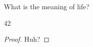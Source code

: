 \documentclass[12pt]{problem-set}
\subtitle{Problem Set 0}
\author{Cooper Simpson, 2425587}
\date{\today}
\begin{document}
	
	\maketitle
	
	\problem
		\question
			What is the meaning of life?
		
		\solution
			\begin{work}
				42
			\end{work}
			
			\begin{proof}
				Huh?
			\end{proof}
	
	
\end{document}
